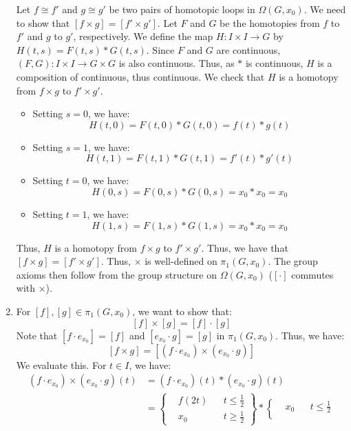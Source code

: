 \documentclass[12pt]{article}
\begin{document}
\begin{solution}
\begin{enumerate}
        Let $f \cong f'$ and $g \cong g'$ be two pairs of homotopic loops in $\Omega(G, x_0)$. We need to show that $[f \times g] = [f' \times g']$. Let $F$ and $G$ be the homotopies from $f$ to $f'$ and $g$ to $g'$, respectively. We define the map $H: I \times I \to G$ by $H(t, s) = F(t, s) \ast G(t, s)$. Since $F$ and $G$ are continuous, $(F, G): I\times I \to G\times G$ is also continuous. Thus, as $\ast$ is continuous, $H$ is a composition of continuous, thus continuous. We check that $H$ is a homotopy from $f \times g$ to $f' \times g'$.
        \begin{itemize}
            \item Setting $s = 0$, we have:
            \[ H(t, 0) = F(t, 0) \ast G(t, 0) = f(t) \ast g(t) \]
            \item Setting $s = 1$, we have:
            \[ H(t, 1) = F(t, 1) \ast G(t, 1) = f'(t) \ast g'(t) \]
            \item Setting $t = 0$, we have:
            \[ H(0, s) = F(0, s) \ast G(0, s) = x_0 \ast x_0 = x_0\]
            \item Setting $t = 1$, we have:
            \[ H(1, s) = F(1, s) \ast G(1, s) = x_0 \ast x_0 = x_0\]
        \end{itemize}
        Thus, $H$ is a homotopy from $f \times g$ to $f' \times g'$. Thus, we have that $[f \times g] = [f' \times g']$. Thus, $\times$ is well-defined on $\pi_1(G, x_0)$. \bbni
        The group axioms then follow from the group structure on $\Omega(G, x_0)$ ($[\cdot]$ commutes with $\times$).
        \item For $[f], [g] \in \pi_1(G, x_0)$, we want to show that:
        \[ [f] \times [g] = [f] \cdot [g]\]
        Note that $[f \cdot e_{x_0}] = [f]$ and $[e_{x_0} \cdot g] = [g]$ in $\pi_1(G, x_0)$. Thus, we have:
        \[ [f \times g] = [(f \cdot e_{x_0}) \times (e_{x_0} \cdot g)]\]
        We evaluate this. For $t \in I$, we have:
        \begin{align*}
            (f \cdot e_{x_0}) \times (e_{x_0} \cdot g)(t) &= (f \cdot e_{x_0})(t) \ast (e_{x_0} \cdot g)(t) \\
            &= \left\{
            \begin{aligned}
                &f(2t) && t \leq \frac{1}{2} \\
                &x_0  && t \geq \frac{1}{2}
            \end{aligned}
            \right\}\ast \left\{
            \begin{aligned}
                &x_0 && t \leq \frac{1}{2} \\

\end{aligned}
\end{align*}
\end{enumerate}
\end{solution}
\end{document}
